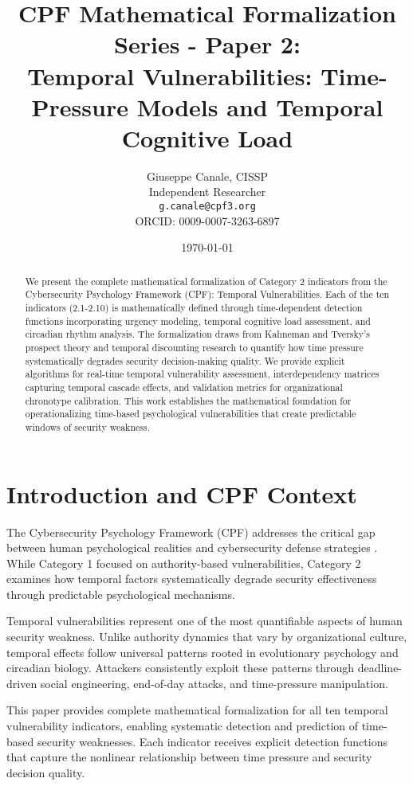 \documentclass[11pt,a4paper]{article}
\title{CPF Mathematical Formalization Series - Paper 2:\\Temporal Vulnerabilities: Time-Pressure Models and Temporal Cognitive Load}
\author{
    Giuseppe Canale, CISSP\\
    Independent Researcher\\
    \texttt{g.canale@cpf3.org}\\
    ORCID: 0009-0007-3263-6897
}
\date{\today}
\begin{document}
\maketitle

\begin{abstract}
We present the complete mathematical formalization of Category 2 indicators from the Cybersecurity Psychology Framework (CPF): Temporal Vulnerabilities. Each of the ten indicators (2.1-2.10) is mathematically defined through time-dependent detection functions incorporating urgency modeling, temporal cognitive load assessment, and circadian rhythm analysis. The formalization draws from Kahneman and Tversky's prospect theory and temporal discounting research to quantify how time pressure systematically degrades security decision-making quality. We provide explicit algorithms for real-time temporal vulnerability assessment, interdependency matrices capturing temporal cascade effects, and validation metrics for organizational chronotype calibration. This work establishes the mathematical foundation for operationalizing time-based psychological vulnerabilities that create predictable windows of security weakness.
\end{abstract}

\section{Introduction and CPF Context}

The Cybersecurity Psychology Framework (CPF) addresses the critical gap between human psychological realities and cybersecurity defense strategies \cite{canale2024cpf}. While Category 1 focused on authority-based vulnerabilities, Category 2 examines how temporal factors systematically degrade security effectiveness through predictable psychological mechanisms.

Temporal vulnerabilities represent one of the most quantifiable aspects of human security weakness. Unlike authority dynamics that vary by organizational culture, temporal effects follow universal patterns rooted in evolutionary psychology and circadian biology. Attackers consistently exploit these patterns through deadline-driven social engineering, end-of-day attacks, and time-pressure manipulation.

This paper provides complete mathematical formalization for all ten temporal vulnerability indicators, enabling systematic detection and prediction of time-based security weaknesses. Each indicator receives explicit detection functions that capture the nonlinear relationship between time pressure and security decision quality.
\end{document}
